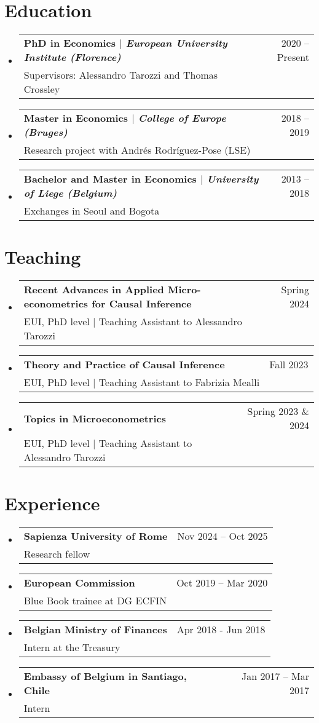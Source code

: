 \documentclass[12pt]{article}
\makeatletter
\newcommand{\CVItem}[1]{
  \item\small{
    {#1 \vspace{-2pt}}
  }
}
\newcommand{\CVSubheading}[4]{
  \vspace{-2pt}\item
    \begin{tabular*}{0.97\textwidth}[t]{l@{\extracolsep{\fill}}r}
      \textbf{#1} & #2 \\
      \small#3 & \small #4 \\
    \end{tabular*}\vspace{-7pt}
}
\newcommand{\CVSubHeadingListStart}{\begin{itemize}[leftmargin=0.5cm, label={}]}
\newcommand{\CVSubHeadingListEnd}{\end{itemize}}
\newcommand{\CVItemListStart}{\begin{itemize}}
\newcommand{\CVItemListEnd}{\end{itemize}\vspace{-5pt}}
\makeatother
\begin{document}
 
\section{Education}
  \CVSubHeadingListStart
    \CVSubheading
      {{PhD in Economics $|$ \emph{\small{European University Institute (Florence)}}}}{2020 -- Present}
      {Supervisors: Alessandro Tarozzi and Thomas Crossley}{}
    \CVSubheading
      {{Master in Economics $|$ \emph{\small{College of Europe (Bruges)}}}}{2018 -- 2019}
      {Research project with Andrés Rodríguez-Pose (LSE)}{}
    \CVSubheading
      {{Bachelor and Master in Economics $|$ \emph{\small{University of Liege (Belgium)}}}}{2013 -- 2018}
      {Exchanges in Seoul and Bogota}{}
  \CVSubHeadingListEnd
  


\section{Teaching}
  \CVSubHeadingListStart
    \CVSubheading
      {{Recent Advances in Applied Micro-econometrics for Causal Inference}}{Spring 2024}
      {EUI, PhD level $|$ Teaching Assistant to Alessandro Tarozzi} {}
     \CVSubheading
      {{Theory and Practice of Causal Inference}}{Fall 2023}
      {EUI, PhD level $|$ Teaching Assistant to Fabrizia Mealli} {}
    \CVSubheading
      {{Topics in Microeconometrics}}{Spring 2023 \& 2024}
      {EUI, PhD level $|$ Teaching Assistant to Alessandro Tarozzi} {}
  \CVSubHeadingListEnd




\section{Experience}
  \CVSubHeadingListStart
    \CVSubheading
      {Sapienza University of Rome}{Nov 2024 -- Oct 2025}
      {Research fellow}{}
    \CVSubheading
      {European Commission}{Oct 2019 -- Mar 2020}
      {Blue Book trainee at DG ECFIN}{}
    \CVSubheading
      {Belgian Ministry of Finances}{Apr 2018 - Jun 2018}
      {Intern at the Treasury}{}
    \CVSubheading
      {Embassy of Belgium in Santiago, Chile}{Jan 2017 -- Mar 2017}
      {Intern}{}
  \CVSubHeadingListEnd
\end{document}
